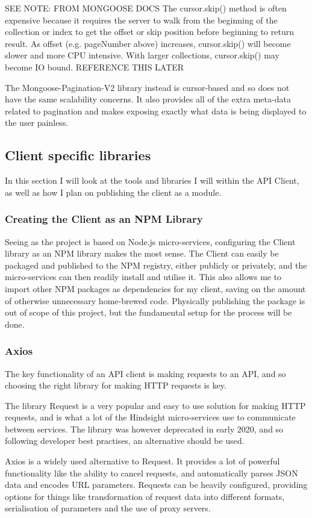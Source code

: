 SEE NOTE:
FROM MONGOOSE DOCS 
The cursor.skip() method is often expensive because it requires the server to walk from the beginning of the collection or index to get the offset or skip position before beginning to return result. As offset (e.g. pageNumber above) increases, cursor.skip() will become slower and more CPU intensive. With larger collections, cursor.skip() may become IO bound.
REFERENCE THIS LATER

The Mongoose-Pagination-V2 library instead is cursor-based and so does not have the same scalability concerns. It also provides all of the extra meta-data related to pagination and makes exposing exactly what data is being displayed to the user painless.

\subsection{Client specific libraries}
In this section I will look at  the tools and libraries I will within the API Client, as well as how I plan on publishing the client as a module. 
\subsubsection{Creating the Client as an NPM Library}
Seeing as the project is based on Node.js micro-services, configuring the Client library as an NPM library makes the most sense. The Client can easily be packaged and published to the NPM registry, either publicly or privately, and the micro-services can then readily install and utilise it. This also allows me to import other NPM packages as dependencies for my client, saving on the amount of otherwise unnecessary home-brewed code. Physically publishing the package is out of scope of this project, but the fundamental setup for the process will be done.
\subsubsection{Axios}
The key functionality of an API client is making requests to an API, and so choosing the right library for making HTTP requests is key.

The library Request is a very popular and easy to use solution for making HTTP requests, and is what a lot of the Hindsight micro-services use to communicate between services. The library was however deprecated in early 2020, and so following developer best practises, an alternative should be used.

Axios is a widely used alternative to Request. It provides a lot of powerful functionality like the ability to cancel requests, and automatically parses JSON data and encodes URL parameters. Requests can be heavily configured, providing options for things like transformation of request data into different formats, serialisation of parameters and the use of proxy servers.

